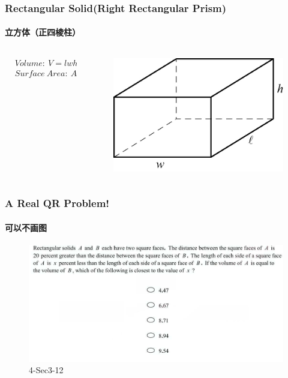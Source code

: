 \documentclass[
	11pt, %
]{beamer}
\begin{document}

\begin{frame}
\frametitle{Rectangular Solid(Right Rectangular Prism)}
\framesubtitle{立方体（正四棱柱）}
	\begin{columns}[t] 
			\begin{column}{0.4\textwidth} %
			\begin{equation*}
			\begin{aligned}
			&Volume: \ V = lwh\\
			&Surface\ Area:\ A = 2(lw + lh + wh)
			\end{aligned}
			\end{equation*}	

			\end{column}
			\begin{column}{0.6\textwidth} %
				\begin{figure}
				\includegraphics[width=\linewidth]{Rectangular_Solid.jpg}
			\end{figure}
			\end{column}
		\end{columns}
\end{frame}




\begin{frame}
	\frametitle{A Real QR Problem!}
	\framesubtitle{可以不画图}
	\begin{figure}
		\includegraphics[width=\linewidth]{Rectangular_Solid_Example_Question1.png}
		\caption{4-Sec3-12}
	\end{figure}
\end{frame}
\end{document}
